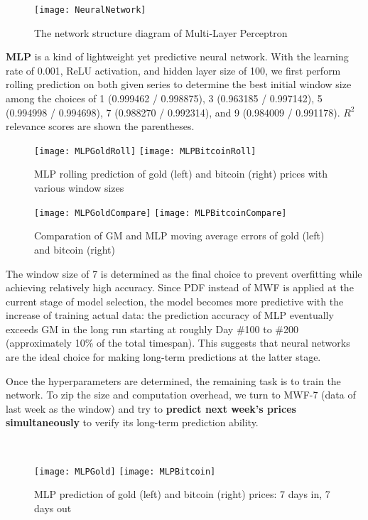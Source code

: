 \documentclass{mcmthesis}
\begin{document}
	\begin{figure}[h]
		\centering \texttt{[image: NeuralNetwork]}
		\caption{The network structure diagram of Multi-Layer Perceptron}
	\end{figure}
	
	\textbf{MLP} is a kind of lightweight yet predictive neural network. With the learning rate of 0.001, ReLU activation, and hidden layer size of 100, we first perform rolling prediction on both given series to determine the best initial window size among the choices of 1 (0.999462 / 0.998875), 3 (0.963185 / 0.997142), 5 (0.994998 / 0.994698), 7 (0.988270 / 0.992314), and 9 (0.984009 / 0.991178). $R^2$ relevance scores are shown the parentheses. 
	
	\begin{figure}[h]
		\centering \texttt{[image: MLPGoldRoll]}
		\centering \texttt{[image: MLPBitcoinRoll]}
		\caption{MLP rolling prediction of gold (left) and bitcoin (right) prices with various window sizes}
	\end{figure}
	
	\begin{figure}[h]
		\centering \texttt{[image: MLPGoldCompare]}
		\centering \texttt{[image: MLPBitcoinCompare]}
		\caption{Comparation of GM and MLP moving average errors of gold (left) and bitcoin (right)}
	\end{figure}

	The window size of 7 is determined as the final choice to prevent overfitting while achieving relatively high accuracy. Since PDF instead of MWF is applied at the current stage of model selection, the model becomes more predictive with the increase of training actual data: the prediction accuracy of MLP eventually exceeds GM in the long run starting at roughly Day \#100 to \#200 (approximately 10\% of the total timespan). This suggests that neural networks are the ideal choice for making long-term predictions at the latter stage. 
	
	Once the hyperparameters are determined, the remaining task is to train the network. To zip the size and computation overhead, we turn to MWF-7 (data of last week as the window) and try to \textbf{predict next week's prices simultaneously} to verify its long-term prediction ability. 
	
	~\\
	
	\begin{figure}[h]
		\centering \texttt{[image: MLPGold]}
		\centering \texttt{[image: MLPBitcoin]}
		\caption{MLP prediction of gold (left) and bitcoin (right) prices: 7 days in, 7 days out}
	\end{figure}
	
\end{document}
